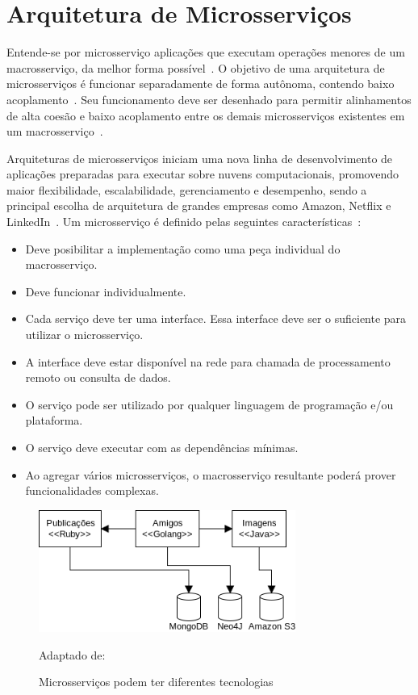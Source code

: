 \section{Arquitetura de Microsserviços}
\label{sec:microsservicos}



Entende-se por microsserviço aplicações que executam operações menores de um macrosserviço, da melhor forma possível~\cite{stephenclarkewillson2017, Newman2015Feb}.
%
O objetivo de uma arquitetura de microsserviços é funcionar separadamente de forma autônoma, contendo baixo acoplamento~\cite{Newman2015Feb}.
%
Seu funcionamento deve ser desenhado para permitir alinhamentos de alta coesão e baixo acoplamento entre os demais microsserviços existentes em um macrosserviço~\cite{8169955}.



Arquiteturas de microsserviços iniciam uma nova linha de desenvolvimento de aplicações preparadas para executar sobre nuvens computacionais, promovendo maior flexibilidade, escalabilidade, gerenciamento e desempenho, sendo a principal escolha de arquitetura de grandes empresas como Amazon, Netflix e LinkedIn~\cite{7830692,7515686}.
%
Um microsserviço é definido pelas seguintes características~\cite{8169955}:



\begin{itemize}
  \item Deve posibilitar a implementação como uma peça individual do macrosserviço.
  \item Deve funcionar individualmente.
  \item Cada serviço deve ter uma interface. Essa interface deve ser o suficiente para utilizar o microsserviço.
  \item A interface deve estar disponível na rede para chamada de processamento remoto ou consulta de dados.
  \item O serviço pode ser utilizado por qualquer linguagem de programação e/ou plataforma.
  \item O serviço deve executar com as dependências mínimas.
  \item Ao agregar vários microsserviços, o macrosserviço resultante poderá prover funcionalidades complexas.
\end{itemize}

\begin{figure}[htb!]
\caption{Microsserviços podem ter diferentes tecnologias}
\label{fig:microsservicos_tecnologias}
\includegraphics[height=4cm]{img/cap2/microsservicos_tecnologias.png}
\centering

Adaptado de:~\cite{Newman2015Feb}
\end{figure}

